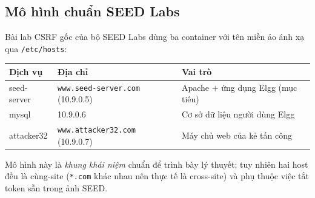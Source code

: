 \documentclass[11pt,a4paper]{article}
\begin{document}
\subsection{Mô hình chuẩn SEED Labs}
Bài lab CSRF gốc của bộ SEED Labs dùng ba container với tên miền ảo ánh xạ qua \texttt{/etc/hosts}:
\begin{center}\small
\begin{tabularx}{\linewidth}{@{}l l Y@{}}
\toprule
\textbf{Dịch vụ} & \textbf{Địa chỉ} & \textbf{Vai trò}\\
\midrule
seed-server & \texttt{www.seed-server.com} (10.9.0.5) & Apache + ứng dụng Elgg (mục tiêu)\\
mysql       & 10.9.0.6 & Cơ sở dữ liệu người dùng Elgg\\
attacker32  & \texttt{www.attacker32.com} (10.9.0.7) & Máy chủ web của kẻ tấn công\\
\bottomrule
\end{tabularx}
\end{center}
\noindent Mô hình này là \emph{khung khái niệm} chuẩn để trình bày lý thuyết; tuy nhiên hai host đều là cùng-site (\texttt{*.com} khác nhau nên thực tế là cross-site) và phụ thuộc việc tắt token sẵn trong ảnh SEED.
\end{document}
